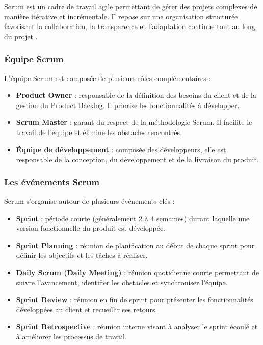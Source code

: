Scrum est un cadre de travail agile permettant de gérer des projets complexes de manière itérative et incrémentale. Il repose sur une organisation structurée favorisant la collaboration, la transparence et l’adaptation continue tout au long du projet \cite{scrum_atlassian} . 
\subsubsection*{Équipe Scrum}

L’équipe Scrum est composée de plusieurs rôles complémentaires \cite{scrum_roles_atlassian} :

\begin{itemize}
    \item \textbf{Product Owner} : responsable de la définition des besoins du client et de la gestion du Product Backlog. Il priorise les fonctionnalités à développer.
    
    \item \textbf{Scrum Master} : garant du respect de la méthodologie Scrum. Il facilite le travail de l’équipe et élimine les obstacles rencontrés.
    
    \item \textbf{Équipe de développement} : composée des développeurs, elle est responsable de la conception, du développement et de la livraison du produit.
\end{itemize}

\subsubsection*{Les événements Scrum}

Scrum s’organise autour de plusieurs événements clés \cite{scrum_ceremonies_atlassian} :

\begin{itemize}
    \item \textbf{Sprint} : période courte (généralement 2 à 4 semaines) durant laquelle une version fonctionnelle du produit est développée.
    
    \item \textbf{Sprint Planning} : réunion de planification au début de chaque sprint pour définir les objectifs et les tâches à réaliser.
    
    \item \textbf{Daily Scrum (Daily Meeting)} : réunion quotidienne courte permettant de suivre l’avancement, identifier les obstacles et synchroniser l’équipe.
    
    \item \textbf{Sprint Review} : réunion en fin de sprint pour présenter les fonctionnalités développées au client et recueillir ses retours.
    
    \item \textbf{Sprint Retrospective} : réunion interne visant à analyser le sprint écoulé et à améliorer les processus de travail.
\end{itemize} 


